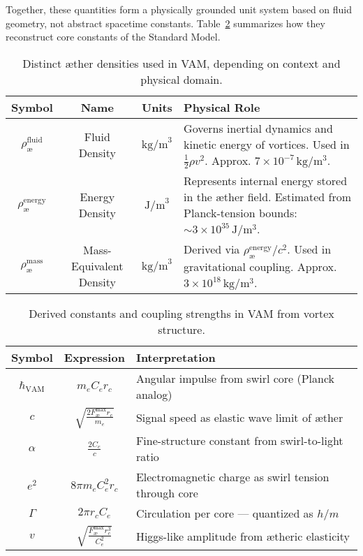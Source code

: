 Together, these quantities form a physically grounded unit system based on fluid geometry, not abstract spacetime constants. Table~\ref{tab:VAM_constants} summarizes how they reconstruct core constants of the Standard Model.
\begin{table}[H]
\centering
\footnotesize
\renewcommand{\arraystretch}{1.3}
\begin{tabular}{|c|c|c|p{7.5cm}|}
\hline
\textbf{Symbol} & \textbf{Name} & \textbf{Units} & \textbf{Physical Role} \\
\hline
\( \rho_\text{\ae}^{\text{fluid}} \) & Fluid Density & \( \mathrm{kg/m}^3 \) & Governs inertial dynamics and kinetic energy of vortices. Used in \( \frac{1}{2} \rho v^2 \). Approx. \( 7 \times 10^{-7} \, \mathrm{kg/m^3} \). \\
\hline
\( \rho_\text{\ae}^{\text{energy}} \) & Energy Density & \( \mathrm{J/m}^3 \) & Represents internal energy stored in the æther field. Estimated from Planck-tension bounds: \( \sim 3 \times 10^{35} \, \mathrm{J/m^3} \). \\
\hline
\( \rho_\text{\ae}^{\text{mass}} \) & Mass-Equivalent Density & \( \mathrm{kg/m}^3 \) & Derived via \( \rho_\text{\ae}^{\text{energy}} / c^2 \). Used in gravitational coupling. Approx. \( 3 \times 10^{18} \, \mathrm{kg/m^3} \). \\
\hline
\end{tabular}
\caption{Distinct æther densities used in VAM, depending on context and physical domain.}
\label{tab:ae_densities_foot}
\end{table}

\begin{table}[H]
    \centering
    \footnotesize
    \renewcommand{\arraystretch}{1.3}
    \begin{tabular}{|c|c|l|}
        \hline
        \textbf{Symbol} & \textbf{Expression} & \textbf{Interpretation} \\
        \hline
        \( \hbar_{\text{VAM}} \) & \( m_e C_e r_c \) & Angular impulse from swirl core (Planck analog) \\
        \hline
        \( c \) & \( \sqrt{\frac{2 F^{\text{max}}_{\text{\ae}} r_c}{m_e}} \) & Signal speed as elastic wave limit of æther \\
        \hline
        \( \alpha \) & \( \frac{2 C_e}{c} \) & Fine-structure constant from swirl-to-light ratio \\
        \hline
        \( e^2 \) & \( 8\pi m_e C_e^2 r_c \) & Electromagnetic charge as swirl tension through core \\
        \hline
        \( \Gamma \) & \( 2\pi r_c C_e \) & Circulation per core — quantized as \( h/m \) \\
        \hline
        \( v \) & \( \sqrt{\frac{F^{\text{max}}_{\text{\ae}} r_c^3}{C_e^2}} \) & Higgs-like amplitude from ætheric elasticity \\
        \hline
    \end{tabular}
    \caption{Derived constants and coupling strengths in VAM from vortex structure.}
    \label{tab:VAM_constants}
\end{table}

